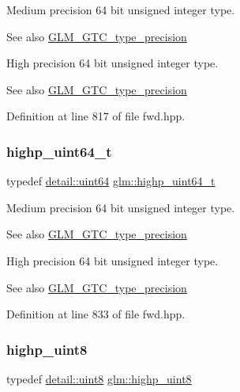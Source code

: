Medium precision 64 bit unsigned integer type. \begin{DoxySeeAlso}{See also}
\mbox{\hyperlink{group__gtc__type__precision}{G\+L\+M\+\_\+\+G\+T\+C\+\_\+type\+\_\+precision}}
\end{DoxySeeAlso}
High precision 64 bit unsigned integer type. \begin{DoxySeeAlso}{See also}
\mbox{\hyperlink{group__gtc__type__precision}{G\+L\+M\+\_\+\+G\+T\+C\+\_\+type\+\_\+precision}} 
\end{DoxySeeAlso}


Definition at line 817 of file fwd.\+hpp.

\mbox{\label{group__gtc__type__precision_ga6e66f40c5909bfc872b068187fa6029e}} 
\subsubsection{\texorpdfstring{highp\_uint64\_t}{highp\_uint64\_t}}
{\footnotesize\ttfamily typedef \mbox{\hyperlink{namespaceglm_1_1detail_adec4b19bf4982125e122db2fe03c5810}{detail\+::uint64}} \mbox{\hyperlink{group__gtc__type__precision_ga6e66f40c5909bfc872b068187fa6029e}{glm\+::highp\+\_\+uint64\+\_\+t}}}

Medium precision 64 bit unsigned integer type. \begin{DoxySeeAlso}{See also}
\mbox{\hyperlink{group__gtc__type__precision}{G\+L\+M\+\_\+\+G\+T\+C\+\_\+type\+\_\+precision}}
\end{DoxySeeAlso}
High precision 64 bit unsigned integer type. \begin{DoxySeeAlso}{See also}
\mbox{\hyperlink{group__gtc__type__precision}{G\+L\+M\+\_\+\+G\+T\+C\+\_\+type\+\_\+precision}} 
\end{DoxySeeAlso}


Definition at line 833 of file fwd.\+hpp.

\mbox{\label{group__gtc__type__precision_ga2c27c6dd26e893786f04b10f99c1ee95}} 
\subsubsection{\texorpdfstring{highp\_uint8}{highp\_uint8}}
{\footnotesize\ttfamily typedef \mbox{\hyperlink{namespaceglm_1_1detail_aef2588f97d090cc19fbbe0c74fe17c8f}{detail\+::uint8}} \mbox{\hyperlink{group__gtc__type__precision_ga2c27c6dd26e893786f04b10f99c1ee95}{glm\+::highp\+\_\+uint8}}}

